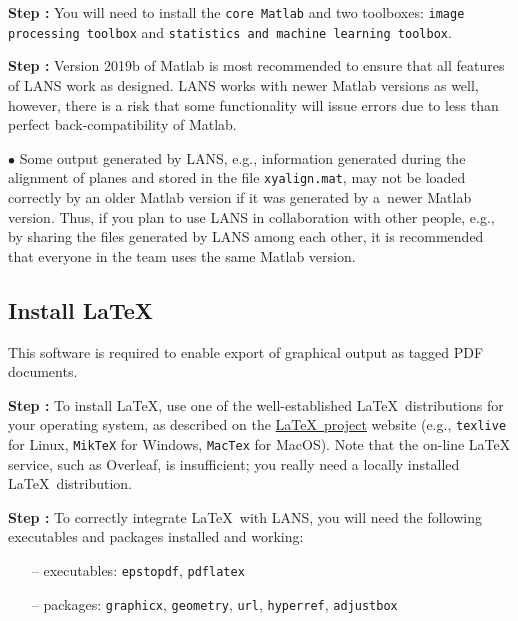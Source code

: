 \documentclass[a4paper, 11pt]{article}
\newcommand{\ttt}[1]{\texttt{#1}}
\newcounter{step}
\newcommand\s{\addtocounter{step}{1}\vskip5pt\noindent\textbf{Step \thestep:}{ }}
\newcommand\bul{\vskip5pt\noindent$\bullet${ }}
\begin{document}
\s You will need to install the \ttt{core Matlab} and two toolboxes: \ttt{image processing toolbox} and \ttt{statistics and machine learning toolbox}. 

\s Version 2019b of Matlab is most recommended to ensure that all features of LANS work as designed. LANS works with newer Matlab versions as well, however, there is a risk that some functionality will issue errors due to less than perfect back-compatibility of Matlab.

\bul Some output generated by LANS, e.g., information generated during the alignment of planes and stored in the file \ttt{xyalign.mat}, may not be loaded correctly by an older Matlab version if it was generated by a~newer Matlab version. Thus, if you plan to use LANS in collaboration with other people, e.g., by sharing the files generated by LANS among each other, it is recommended that everyone in the team uses the same Matlab version.


\subsection{Install \LaTeX}
\setcounter{step}{0}

This software is required to enable export of graphical output as tagged PDF documents. 

\s To install \LaTeX, use one of the well-established \LaTeX\ distributions for your operating system, as described on the \href{https://www.latex-project.org/get/}{\LaTeX\ project} website (e.g., \ttt{texlive} for Linux, \ttt{MikTeX} for Windows, \ttt{MacTex} for MacOS). Note that the on-line LaTeX service, such as Overleaf, is insufficient; you really need a locally installed \LaTeX\ distribution.
 
\s To correctly integrate \LaTeX\ with LANS, you will need the following executables and packages installed and working:
 
\begin{itemize}
\item[--] executables: \ttt{epstopdf}, \ttt{pdflatex}
\item[--] packages: \ttt{graphicx}, \ttt{geometry}, \ttt{url}, \ttt{hyperref}, \ttt{adjustbox}
\end{itemize}
 
\end{document}
